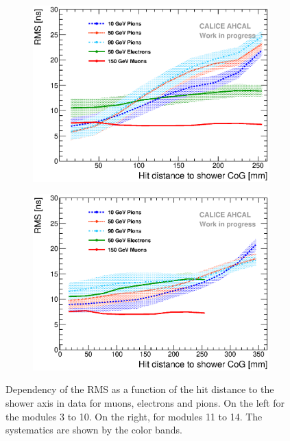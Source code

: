 \begin{figure}[htbp!]
	\begin{subfigure}[t]{0.49\textwidth}
		\centering
		\includegraphics[width=1\textwidth]{../Thesis_Plots/Timing/Pions/Plots/Timing_Radius_Comparison_ShortAsymRange_SSF_RMS.eps}
		\caption{} \label{fig:Radius_RMS_SSF_50GeV}
	\end{subfigure}
	\hfill
	\begin{subfigure}[t]{0.49\textwidth}
		\centering
		\includegraphics[width=1\textwidth]{../Thesis_Plots/Timing/Pions/Plots/Timing_Radius_Comparison_ShortAsymRange_BL_RMS.eps}
		\caption{} \label{fig:Radius_RMS_BL_50GeV}
	\end{subfigure}
	\caption{Dependency of the RMS as a function of the hit distance to the shower axis in data for muons, electrons and pions. On the left for the modules 3 to 10. On the right, for modules 11 to 14. The systematics are shown by the color bands.}
	\label{fig:Radius_RMS_Data_50GeV}
\end{figure}

